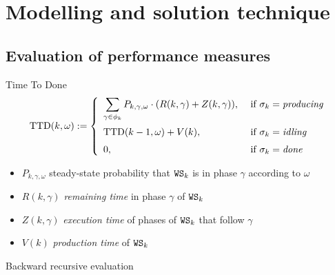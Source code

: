 
\section{Modelling and solution technique}  
  \subsection{Evaluation of performance measures}
    \begin{frame}{Time To Done}
      \begin{equation*}
        \mbox{TTD}(k,\omega) := \left\{ \begin{array}{ll}
          \displaystyle \sum_{\gamma\in \phi_k} P_{k, \gamma,\omega} \cdot (R(k,\gamma) + Z(k,\gamma)), &  \mbox{ if } \sigma_k=\mbox{\em producing}
          \medskip\\
          \mbox{TTD}(k-1,\omega) + V(k), & \mbox{ if } \sigma_k=\mbox{\em idling}
          \medskip\\
          0, & \mbox{ if } \sigma_k=\mbox{\em done}
        \end{array} \right.
        \label{eq:ttd}
      \end{equation*}
      
      \begin{itemize}
        \item $P_{k,\gamma,\omega}$ steady-state probability that $\mathtt{WS}_k$ is in phase $\gamma$ according to $\omega$
        \item $R(k,\gamma)$ \textit{remaining time} in phase $\gamma$ of $\mathtt{WS}_k$
        \item $Z(k,\gamma)$ \textit{execution time} of phases of $\mathtt{WS}_k$ that follow $\gamma$
        \item $V(k)$ \textit{production time} of $\mathtt{WS}_k$
      \end{itemize}
      
      \begin{center}\hspace{-0.5cm}\scalebox{0.8}{}\end{center}
      
      Backward recursive evaluation
    \end{frame}
    
